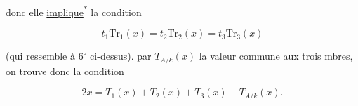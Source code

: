 donc elle \uline{implique}\textsuperscript{*} la condition


\[
 \boxed{t_1\mathrm{Tr}_1(x)=t_2\mathrm{Tr}_2(x)=t_3\mathrm{Tr}_3(x)}
\]

(qui ressemble à $6^\circ$ ci-dessus).   par $T_{A/k}(x)$ la valeur commune aux trois mbres, on trouve donc la condition

\[
 \boxed{2x=T_1(x)+T_2(x)+T_3(x)-T_{A/k}(x).}
\]


